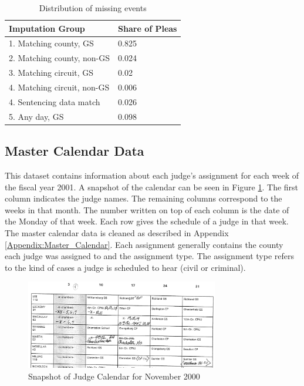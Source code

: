 \documentclass[11pt, oneside]{article}   	%
\theoremstyle{ModifiedStyle}
\begin{document}
      \begin{table}[H]
          \centering
          \caption{Distribution of missing events}
          \label{tab:imp}
          \begin{tabular}{|l|l|}
          \hline
          \textbf{Imputation Group}   & \textbf{Share of Pleas} \\ \hline
          1. Matching county, GS      & 0.825                   \\ \hline
          2. Matching county, non-GS  & 0.024                   \\ \hline
          3. Matching circuit, GS     & 0.02                    \\ \hline
          4. Matching circuit, non-GS & 0.006                   \\ \hline
          4. Sentencing data match & 0.026 \\ \hline
          5. Any day, GS              & 0.098                    \\ \hline
          \end{tabular}
      \end{table}

  \subsection{Master Calendar Data}
    This dataset contains information about each judge's assignment for each week of the fiscal year 2001. A snapshot of the calendar can be seen in Figure \ref{fig-calendar}. The first column indicates the judge names. The remaining columns correspond to the weeks in that month. The number written on top of each column is the date of the Monday of that week. Each row gives the schedule of a judge in that week. The master calendar data is cleaned as described in Appendix \ref{Appendix:Master_Calendar}. Each assignment generally contains the county each judge was assigned to and the assignment type. The assignment type refers to the kind of cases a judge is scheduled to hear (civil or criminal).

    \begin{figure}[h]
        \centering
        \caption{Snapshot of Judge Calendar for November 2000}
        \label{fig-calendar}
        \includegraphics[width=0.75\textwidth, keepaspectratio=true]{Figures/Fig4.png}
      \end{figure}
\end{document}
